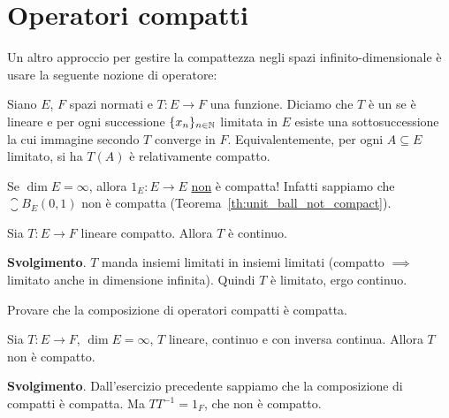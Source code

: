 \section{Operatori compatti}
Un altro approccio per gestire la compattezza negli spazi infinito-dimensionale è usare la seguente nozione di operatore:

\begin{definition}
	Siano $E$, $F$ spazi normati e $T:E \to F$ una funzione.
	Diciamo che $T$ è un  se è lineare e per ogni successione $\{x_n\}_{n \in \mathbb{N}}$ limitata in $E$ esiste una sottosuccessione la cui immagine secondo $T$ converge in $F$. Equivalentemente, per ogni $A \subseteq E$ limitato, si ha $T(A)$ è relativamente compatto.
\end{definition}

\begin{example}
	Se $\dim E = \infty$, allora $1_E : E \to E$ \underline{non} è compatta! Infatti sappiamo che $\closure{B}_E(0,1)$ non è compatta (Teorema~\ref{th:unit_ball_not_compact}).
\end{example}

\begin{exercise}
	Sia $T:E \to F$ lineare compatto. Allora $T$ è continuo.

	\textbf{Svolgimento}. $T$ manda insiemi limitati in insiemi limitati (compatto $\implies$ limitato anche in dimensione infinita). Quindi $T$ è limitato, ergo continuo.
\end{exercise}

\begin{exercise}
	Provare che la composizione di operatori compatti è compatta.
\end{exercise}

\begin{exercise}
	Sia $T:E \to F$, $\dim E = \infty$, $T$ lineare, continuo e con inversa continua.
	Allora $T$ non è compatto.

	\textbf{Svolgimento}. Dall'esercizio precedente sappiamo che la composizione di compatti è compatta. Ma $TT^{-1} = 1_F$, che non è compatto.
\end{exercise}

